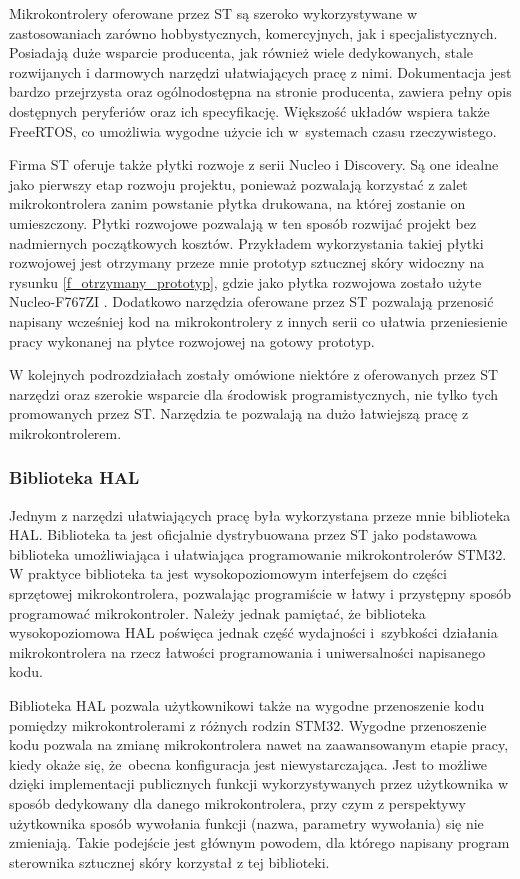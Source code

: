 Mikrokontrolery oferowane przez ST są szeroko wykorzystywane w zastosowaniach zarówno hobbystycznych, komercyjnych, jak i specjalistycznych. Posiadają duże wsparcie producenta, jak również wiele dedykowanych, stale rozwijanych i darmowych narzędzi ułatwiających pracę z nimi. Dokumentacja jest bardzo przejrzysta oraz ogólnodostępna na stronie producenta, zawiera pełny opis dostępnych peryferiów oraz ich specyfikację. Większość układów wspiera także FreeRTOS, co umożliwia wygodne użycie ich w~systemach czasu rzeczywistego.

Firma ST oferuje także płytki rozwoje z serii Nucleo i Discovery. Są one idealne jako pierwszy etap rozwoju projektu, ponieważ pozwalają korzystać z zalet mikrokontrolera zanim powstanie płytka drukowana, na której zostanie on umieszczony. Płytki rozwojowe pozwalają w ten sposób rozwijać projekt bez nadmiernych początkowych kosztów. Przykładem wykorzystania takiej płytki rozwojowej jest otrzymany przeze mnie prototyp sztucznej skóry widoczny na rysunku \ref{f_otrzymany_prototyp}, gdzie jako płytka rozwojowa zostało użyte Nucleo-F767ZI \cite{b_report_otrzymane}.
Dodatkowo narzędzia oferowane przez ST pozwalają przenosić napisany wcześniej kod na mikrokontrolery z innych serii co ułatwia przeniesienie pracy wykonanej na płytce rozwojowej na gotowy prototyp.

W kolejnych podrozdziałach zostały omówione niektóre z oferowanych przez ST narzędzi oraz szerokie wsparcie dla środowisk programistycznych, nie tylko tych promowanych przez ST. Narzędzia te pozwalają na dużo łatwiejszą pracę z mikrokontrolerem.

\subsubsection{Biblioteka HAL}
Jednym z narzędzi ułatwiających pracę była wykorzystana przeze mnie biblioteka HAL. Biblioteka ta jest oficjalnie dystrybuowana przez ST jako podstawowa biblioteka umożliwiająca i ułatwiająca programowanie mikrokontrolerów STM32. W praktyce biblioteka ta jest wysokopoziomowym interfejsem do części sprzętowej mikrokontrolera, pozwalając programiście w łatwy i przystępny sposób programować mikrokontroler.
Należy jednak pamiętać, że biblioteka wysokopoziomowa HAL poświęca jednak część wydajności i~szybkości działania mikrokontrolera na rzecz łatwości programowania i uniwersalności napisanego kodu.

Biblioteka HAL pozwala użytkownikowi także na wygodne przenoszenie kodu pomiędzy mikrokontrolerami z różnych rodzin STM32. Wygodne przenoszenie kodu pozwala na zmianę mikrokontrolera nawet na zaawansowanym etapie pracy, kiedy okaże się, że~obecna konfiguracja jest niewystarczająca. 
Jest to możliwe dzięki implementacji publicznych funkcji wykorzystywanych przez użytkownika w sposób dedykowany dla danego mikrokontrolera, przy czym z perspektywy użytkownika sposób wywołania funkcji (nazwa, parametry wywołania) się nie zmieniają. Takie podejście jest głównym powodem, dla którego napisany program sterownika sztucznej skóry korzystał z tej biblioteki.

